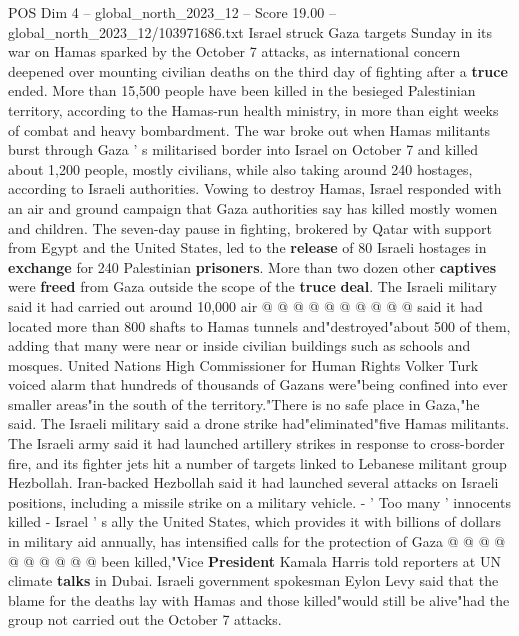 \begin{textsample}{POS Dim 4 – global\_north\_2023\_12 – Score 19.00 – global\_north\_2023\_12/103971686.txt}  \label{ex:f4_pos_308}
Israel struck Gaza targets Sunday in its war on Hamas sparked by the October 7 attacks, as international concern deepened over mounting civilian deaths on the third day of fighting after a \textbf{truce} ended.
More than 15,500 people have been killed in the besieged Palestinian territory, according to the Hamas-run health ministry, in more than eight weeks of combat and heavy bombardment.
The war broke out when Hamas militants burst through Gaza ' s militarised border into Israel on October 7 and killed about 1,200 people, mostly civilians, while also taking around 240 hostages, according to Israeli authorities.
Vowing to destroy Hamas, Israel responded with an air and ground campaign that Gaza authorities say has killed mostly women and children.
The seven-day pause in fighting, brokered by Qatar with support from Egypt and the United States, led to the \textbf{release} of 80 Israeli hostages in \textbf{exchange} for 240 Palestinian \textbf{prisoners}.
More than two dozen other \textbf{captives} were \textbf{freed} from Gaza outside the scope of the \textbf{truce} \textbf{deal}.
The Israeli military said it had carried out around 10,000 air @ @ @ @ @ @ @ @ @ @ said it had located more than 800 shafts to Hamas tunnels and"destroyed"about 500 of them, adding that many were near or inside civilian buildings such as schools and mosques.
United Nations High Commissioner for Human Rights Volker Turk voiced alarm that hundreds of thousands of Gazans were"being confined into ever smaller areas"in the south of the territory."There is no safe place in Gaza,"he said.
The Israeli military said a drone strike had"eliminated"five Hamas militants.
The Israeli army said it had launched artillery strikes in response to cross-border fire, and its fighter jets hit a number of targets linked to Lebanese militant group Hezbollah.
Iran-backed Hezbollah said it had launched several attacks on Israeli positions, including a missile strike on a military vehicle. - ' Too many ' innocents killed - Israel ' s ally the United States, which provides it with billions of dollars in military aid annually, has intensified calls for the protection of Gaza @ @ @ @ @ @ @ @ @ @ been killed,"Vice \textbf{President} Kamala Harris told reporters at UN climate \textbf{talks} in Dubai.
Israeli government spokesman Eylon Levy said that the blame for the deaths lay with Hamas and those killed"would still be alive"had the group not carried out the October 7 attacks.

\end{textsample}
